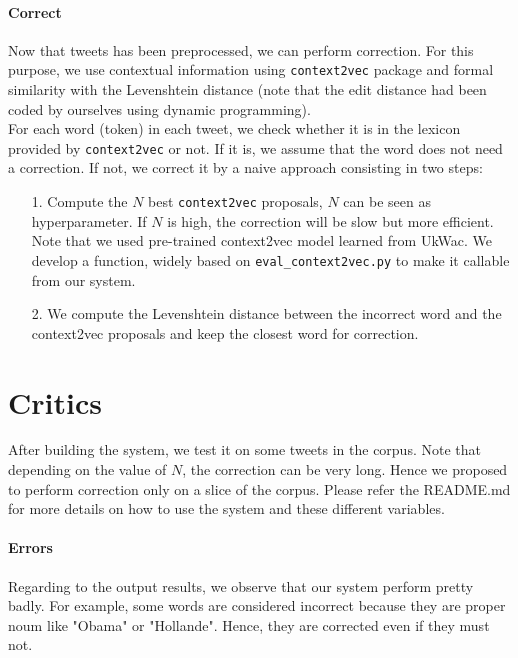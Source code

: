 \documentclass[11pt]{article}
\begin{document}
  \paragraph{Correct} %
  \label{sub:correct}
    Now that tweets has been preprocessed, we can perform correction. For this purpose, we use contextual information using \texttt{context2vec} package and formal similarity with the Levenshtein distance (note that the edit distance had been coded by ourselves using dynamic programming). \\
    For each word (token) in each tweet, we check whether it is in the lexicon provided by \texttt{context2vec} or not. If it is, we assume that the word does not need a correction. If not, we correct it by a naive approach consisting in two steps:
    \begin{enumerate}
      \item[1.] Compute the $N$ best \texttt{context2vec} proposals, $N$ can be seen as hyperparameter. If $N$ is high, the correction will be slow but more efficient. Note that we used pre-trained context2vec model learned from UkWac. We develop a function, widely based on \texttt{eval\_context2vec.py} to make it callable from our system.
      \item[2.] We compute the Levenshtein distance between the incorrect word and the context2vec proposals and keep the closest word for correction.
    \end{enumerate}

\section{Critics} %
\label{sec:critics}
  After building the system, we test it on some tweets in the corpus. Note that depending on the value of $N$, the correction can be very long. Hence we proposed to perform correction only on a slice of the corpus. Please refer the README.md for more details on how to use the system and these different variables.\\

  \paragraph{Errors} %
  \label{par:errors}

  Regarding to the output results, we observe that our system perform pretty badly. For example, some words are considered incorrect because they are proper noum like "Obama" or "Hollande". Hence, they are corrected even if they must not. 
\end{document}
